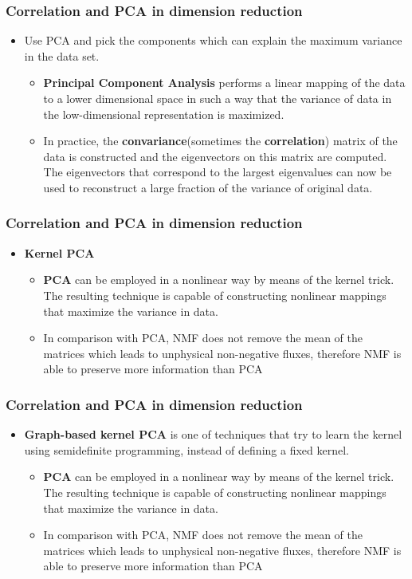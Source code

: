 \documentclass[11pt]{beamer}
\begin{document}
\begin{frame}
\frametitle{Correlation and PCA in dimension reduction}
\begin{itemize}
	\item Use PCA and pick the components which can explain the maximum variance in the data set. 
	\begin{itemize}
		\item \textbf{Principal Component Analysis} performs a linear mapping of the data to a lower dimensional space in such a way that the variance of data in the low-dimensional representation is maximized. 
		\item In practice, the \textbf{convariance}(sometimes the \textbf{correlation}) matrix of the data is constructed and the eigenvectors on this matrix are computed. The eigenvectors that correspond to the largest eigenvalues can now be used to reconstruct a large fraction of the variance of original data.
	\end{itemize}
\end{itemize}
\end{frame}

\begin{frame}
\frametitle{Correlation and PCA in dimension reduction}
\begin{itemize}
	\item \textbf{Kernel PCA}
	\begin{itemize}
		\item \textbf{PCA} can be employed in a nonlinear way by means of the kernel trick. The resulting technique is capable of constructing nonlinear mappings that maximize the variance in data.
		\item In comparison with PCA, NMF does not remove the mean of the matrices which leads to unphysical non-negative fluxes, therefore NMF is able to preserve more information than PCA
	\end{itemize}
\end{itemize}
\end{frame}

\begin{frame}
\frametitle{Correlation and PCA in dimension reduction}
\begin{itemize}
	\item \textbf{Graph-based kernel PCA} is one of techniques that try to learn the kernel using semidefinite programming, instead of defining a fixed kernel.
	\begin{itemize}
		\item \textbf{PCA} can be employed in a nonlinear way by means of the kernel trick. The resulting technique is capable of constructing nonlinear mappings that maximize the variance in data.
		\item In comparison with PCA, NMF does not remove the mean of the matrices which leads to unphysical non-negative fluxes, therefore NMF is able to preserve more information than PCA
	\end{itemize}
\end{itemize}
\end{frame}
\end{document}
